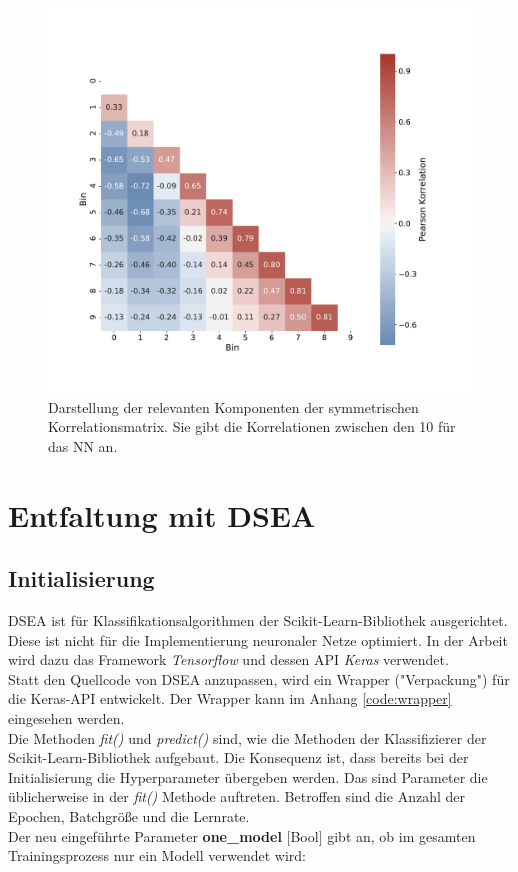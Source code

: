 \begin{figure}
    \centering
    \includegraphics[width=\textwidth]{Plots/NN/correlation_matrix.pdf}
    \caption[Korrelationsmatrix des NN ohne DSEA]{Darstellung der relevanten Komponenten der symmetrischen Korrelationsmatrix.
    Sie gibt die Korrelationen zwischen den \SI{10}{} für das NN an.
    }
    \label{fig:nn_correlation}
\end{figure}

\section{Entfaltung mit DSEA} \label{sec:deconv_dsea}
\subsection{Initialisierung}
DSEA ist für Klassifikationsalgorithmen der Scikit-Learn-Bibliothek\cite{scikit-learn} ausgerichtet.
Diese ist nicht für die Implementierung neuronaler Netze optimiert.
In der Arbeit wird dazu das Framework \textit{Tensorflow}\cite{tensorflow2015-whitepaper} und dessen API \textit{Keras} verwendet.
\\
Statt den Quellcode von DSEA anzupassen, wird ein Wrapper ("Verpackung") für die Keras-API entwickelt.
Der Wrapper kann im Anhang \ref{code:wrapper} eingesehen werden.
\\
Die Methoden \textit{fit()} und \textit{predict()} sind, wie die Methoden der Klassifizierer der Scikit-Learn-Bibliothek aufgebaut.
Die Konsequenz ist, dass bereits bei der Initialisierung die Hyperparameter übergeben werden.
Das sind Parameter die üblicherweise in der \textit{fit()} Methode auftreten. 
Betroffen sind die Anzahl der Epochen, Batchgröße und die Lernrate.
\\
Der neu eingeführte Parameter \textbf{one\_model} $[$Bool$]$ gibt an, ob im gesamten Trainingsprozess nur ein Modell verwendet wird:

